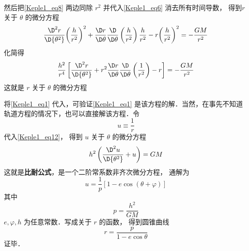 然后把\autoref{Keple1_eq8} 两边同除 $r^2$ 并代入\autoref{Keple1_eq6} 消去所有时间导数，
得到$r$ 关于 $\theta$ 的微分方程
\begin{equation}
\frac{{{\D^2}r}}{{\D{\theta ^2}}}{\left( {\frac{h}{{{r^2}}}} \right)^2} + \frac{{\D r}}{{\D\theta }}\frac{\D}{{\D\theta }}\left( {\frac{h}{{{r^2}}}} \right)\frac{h}{{{r^2}}} - r{\left( {\frac{h}{{{r^2}}}} \right)^2} =  - \frac{{GM}}{{{r^2}}}
\end{equation}
化简得
\begin{equation}\label{Keple1_eq12}
\frac{{{h^2}}}{{{r^4}}}\left[ {\frac{{{\D^2}r}}{{\D{\theta ^2}}} + r^2\frac{{\D r}}{{\D\theta }}\frac{\D}{{\D\theta }}\left( {\frac{1}{{{r^2}}}} \right) - r} \right] =  - \frac{{GM}}{{{r^2}}}
\end{equation}
这就是 $r$ 关于 $\theta $ 的微分方程

将\autoref{Keple1_eq1} 代入，可验证\autoref{Keple1_eq1} 是该方程的解．当然，在事先不知道轨道方程的情况下，也可以直接解该方程．令
\begin{equation}\label{Keple1_eq13}
u \equiv \frac{1}{r}
\end{equation}
代入\autoref{Keple1_eq12}，  得到 $u$ 关于 $\theta $ 的微分方程
\begin{equation}\label{Keple1_eq15}
{h^2}\left( {\frac{{{\D^2}u}}{{\D{\theta ^2}}} + u} \right) =  GM
\end{equation}
这就是\textbf{比耐公式}，是一个二阶常系数非齐次微分方程，
通解为
\begin{equation}
u = \frac{1}{p}\left[1 - e\cos(\theta  + \varphi)\right]
\end{equation}
其中
\begin{equation}
p = \frac{h^2}{GM}
\end{equation}
$e, \varphi, h$ 为任意常数．写成关于 $r$ 的函数， 得到圆锥曲线
\begin{equation}\label{Keple1_eq16}
r = \frac{p}{{1 - e \cos \theta }}
\end{equation}
证毕．

